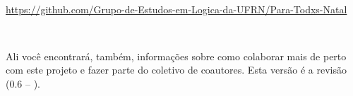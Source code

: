 \

\hbox{{\footnotesize \url{https://github.com/Grupo-de-Estudos-em-Logica-da-UFRN/Para-Todxs-Natal}}} 

\

\noindent Ali você encontrará, também, informações sobre como colaborar mais de perto com este projeto e fazer parte do coletivo de coautores.
Esta versão é a revisão (0.6 -- \mydate).



